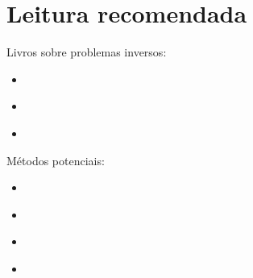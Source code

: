 \chapter{Leitura recomendada}

\noindent 
Livros sobre problemas inversos:

\begin{itemize}
\item \cite{tarantola}
\item \cite{menke}
\item \cite{aster}
\end{itemize}

\noindent
Métodos potenciais:

\begin{itemize}
\item \cite{silva_etal2001}
\item \cite{medeiros&silva1996}
\item \cite{martins_etal2011}
\item \cite{barbosa&silva2011}
\end{itemize}
